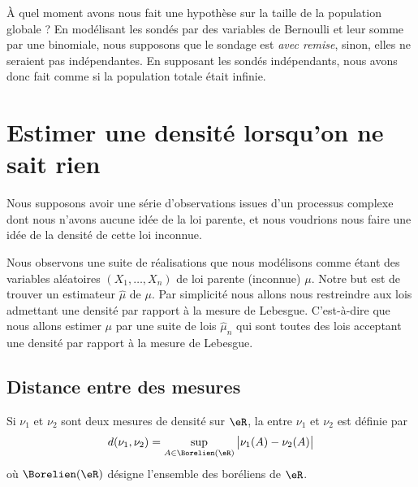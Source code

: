 \begin{remark}
    À quel moment avons nous fait une hypothèse sur la taille de la population globale ? En modélisant les sondés par des variables de Bernoulli et leur somme par une binomiale, nous supposons que le sondage est \emph{avec remise}, sinon, elles ne seraient pas indépendantes. En supposant les sondés indépendants, nous avons donc fait comme si la population totale était infinie.
\end{remark}

\section{Estimer une densité lorsqu'on ne sait rien}

Nous supposons avoir une série d'observations issues d'un processus complexe dont nous n'avons aucune idée de la loi parente, et nous voudrions nous faire une idée de la densité de cette loi inconnue.

Nous observons une suite de réalisations que nous modélisons comme étant des variables aléatoires \( (X_1,\ldots, X_n)\) de loi parente (inconnue) \( \mu\). Notre but est de trouver un estimateur \( \hat \mu\) de \( \mu\). Par simplicité nous allons nous restreindre aux lois admettant une densité par rapport à la mesure de Lebesgue. C'est-à-dire que nous allons estimer \( \mu\) par une suite de lois \( \hat \mu_n\) qui sont toutes des lois acceptant une densité par rapport à la mesure de Lebesgue.

\subsection{Distance entre des mesures}

Si \( \nu_1\) et \( \nu_2\) sont deux mesures de densité sur \( \eR\), la  entre \( \nu_1\) et \( \nu_2\) est définie par
\begin{equation}
    d(\nu_1,\nu_2)=\sup_{A\in\Borelien(\eR)}\big| \nu_1(A)-\nu_2(A) \big|
\end{equation}
où \( \Borelien(\eR)\) désigne l'ensemble des boréliens de \( \eR\).


